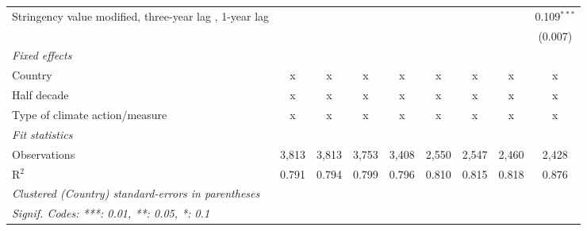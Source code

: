 \begin{table}[htbp]
\begin{tabular}{lcccccccc}
      Stringency value modified, three-year lag , 1-year lag                      &               &               &               &               &               &               &               & 0.109$^{***}$\\   
                                                                                  &               &               &               &               &               &               &               & (0.007)\\   
      \emph{Fixed effects}\\
      Country                                                                     & x             & x             & x             & x             & x             & x             & x             & x\\  
      Half decade                                                                 & x             & x             & x             & x             & x             & x             & x             & x\\  
      Type of climate action/measure                                              & x             & x             & x             & x             & x             & x             & x             & x\\  
      \midrule \emph{Fit statistics}\\
      Observations                                                                & 3,813         & 3,813         & 3,753         & 3,408         & 2,550         & 2,547         & 2,460         & 2,428\\  
      R$^2$                                                                       & 0.791         & 0.794         & 0.799         & 0.796         & 0.810         & 0.815         & 0.818         & 0.876\\  
      \midrule
      \multicolumn{9}{l}{\emph{Clustered (Country) standard-errors in parentheses}}\\
      \multicolumn{9}{l}{\emph{Signif. Codes: ***: 0.01, **: 0.05, *: 0.1}}\\
   \end{tabular}
\end{table}


